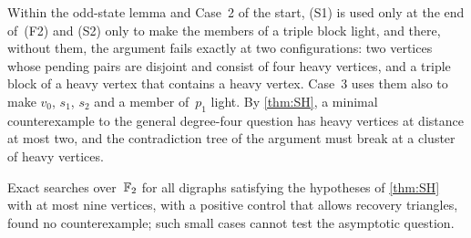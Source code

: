 \begin{remark}\label{rem:SH-stop}
Within the odd-state lemma and Case~2 of the start, (S1) is used only at the end of~(F2) and (S2) only to make the members of
a triple block light, and there, without them, the argument fails exactly at two configurations: two vertices whose pending
pairs are disjoint and consist of four heavy vertices, and a triple block of a heavy vertex that contains a heavy vertex. Case~3
uses them also to make $v_0$, $s_1$, $s_2$ and a member of~$p_1$ light. By \cref{thm:SH}, a minimal counterexample to the
general degree-four question has heavy vertices at distance at most two, and the contradiction tree of the argument must break
at a cluster of heavy vertices.
\end{remark}

\begin{remark}\label{rem:SH-small}
Exact searches over~$\mathbb{F}_2$ for all digraphs satisfying the hypotheses of \cref{thm:SH} with at most nine vertices, with a
positive control that allows recovery triangles, found no counterexample; such small cases cannot test the asymptotic
question.
\end{remark}
